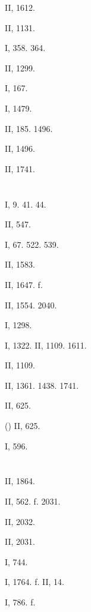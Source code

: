  II, 1612.

 II, 1131.

 I, 358. 364.

 II, 1299.

 I, 167.

 I, 1479.

 II, 185. 1496.

 II, 1496.

 II, 1741.

\section{}

 I, 9. 41. 44.

 II, 547.

 I, 67. 522. 539.

 II, 1583.

 II, 1647. f.

 II, 1554. 2040.

 I, 1298.

 I, 1322. II, 1109. 1611.

 II, 1109.

 II, 1361. 1438. 1741.

 II, 625.

 () II, 625.

 I, 596.

\section{}

 II, 1864.

 II, 562. f. 2031.

 II, 2032.

 II, 2031.

 I, 744.

 I, 1764. f. II, 14.

 I, 786. f.

